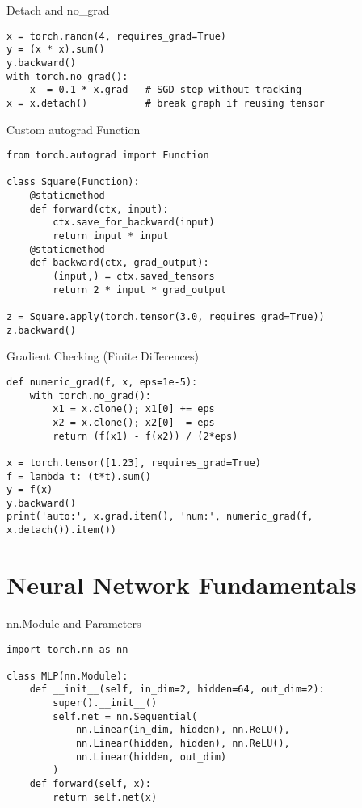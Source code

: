 \documentclass[aspectratio=169,10pt]{beamer}
\begin{document}
\begin{frame}[fragile]{Detach and no\_grad}
\begin{lstlisting}
x = torch.randn(4, requires_grad=True)
y = (x * x).sum()
y.backward()
with torch.no_grad():
    x -= 0.1 * x.grad   # SGD step without tracking
x = x.detach()          # break graph if reusing tensor
\end{lstlisting}
\end{frame}

\begin{frame}[fragile]{Custom autograd Function}
\begin{lstlisting}
from torch.autograd import Function

class Square(Function):
    @staticmethod
    def forward(ctx, input):
        ctx.save_for_backward(input)
        return input * input
    @staticmethod
    def backward(ctx, grad_output):
        (input,) = ctx.saved_tensors
        return 2 * input * grad_output

z = Square.apply(torch.tensor(3.0, requires_grad=True))
z.backward()
\end{lstlisting}
\end{frame}

\begin{frame}[fragile]{Gradient Checking (Finite Differences)}
\begin{lstlisting}
def numeric_grad(f, x, eps=1e-5):
    with torch.no_grad():
        x1 = x.clone(); x1[0] += eps
        x2 = x.clone(); x2[0] -= eps
        return (f(x1) - f(x2)) / (2*eps)

x = torch.tensor([1.23], requires_grad=True)
f = lambda t: (t*t).sum()
y = f(x)
y.backward()
print('auto:', x.grad.item(), 'num:', numeric_grad(f, x.detach()).item())
\end{lstlisting}
\end{frame}

\section{Neural Network Fundamentals}

\begin{frame}[fragile]{nn.Module and Parameters}
\begin{lstlisting}
import torch.nn as nn

class MLP(nn.Module):
    def __init__(self, in_dim=2, hidden=64, out_dim=2):
        super().__init__()
        self.net = nn.Sequential(
            nn.Linear(in_dim, hidden), nn.ReLU(),
            nn.Linear(hidden, hidden), nn.ReLU(),
            nn.Linear(hidden, out_dim)
        )
    def forward(self, x):
        return self.net(x)
\end{lstlisting}
\end{frame}
\end{document}

